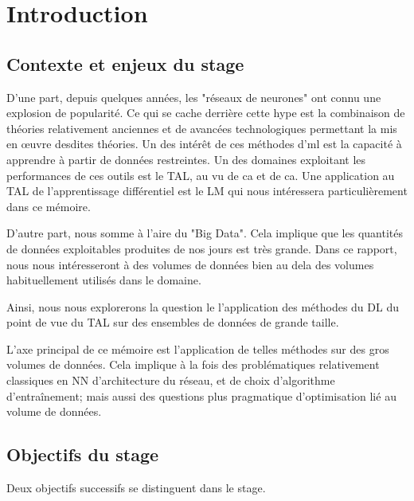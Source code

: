 \chapter{Introduction}

\section[Contexte \& Enjeux]{Contexte et enjeux du stage}

D'une part, depuis quelques années, les "réseaux de neurones" ont connu une explosion de popularité.
Ce qui se cache derrière cette hype est la combinaison de théories relativement anciennes et de avancées technologiques permettant la mis en œuvre desdites théories.%
Un des intérêt de ces méthodes d'\gls{ml} est la capacité à apprendre à partir de données restreintes.
Un des domaines exploitant les performances de ces outils est le TAL, au vu de ca et de ca.%
Une application au TAL de l'apprentissage différentiel est le LM qui nous intéressera particulièrement dans ce mémoire.%

D'autre part, nous somme à l'aire du "Big Data". Cela implique que les quantités de données exploitables produites de nos jours est très grande. Dans ce rapport, nous nous intéresseront à des volumes de données bien au dela des volumes habituellement utilisés dans le domaine.

Ainsi, nous nous explorerons la question le l'application des méthodes du DL du point de vue du TAL sur des ensembles de données de grande taille.

L'axe principal de ce mémoire est l'application de telles méthodes sur des gros volumes de données.
Cela implique à la fois des problématiques relativement classiques en NN d'architecture du réseau, et de choix d'algorithme d'entraînement; mais aussi des questions plus pragmatique d'optimisation lié au volume de données.%


\section[Objectifs]{Objectifs du stage}
Deux objectifs successifs se distinguent dans le stage.

